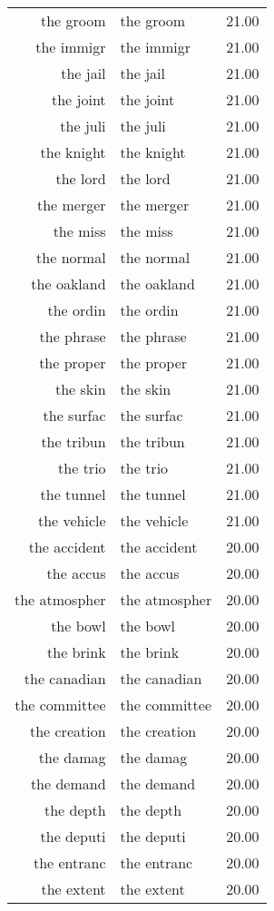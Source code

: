 \begin{table}[ht]
\begin{tabular}{rlr}
  the groom & the groom & 21.00 \\ 
  the immigr & the immigr & 21.00 \\ 
  the jail & the jail & 21.00 \\ 
  the joint & the joint & 21.00 \\ 
  the juli & the juli & 21.00 \\ 
  the knight & the knight & 21.00 \\ 
  the lord & the lord & 21.00 \\ 
  the merger & the merger & 21.00 \\ 
  the miss & the miss & 21.00 \\ 
  the normal & the normal & 21.00 \\ 
  the oakland & the oakland & 21.00 \\ 
  the ordin & the ordin & 21.00 \\ 
  the phrase & the phrase & 21.00 \\ 
  the proper & the proper & 21.00 \\ 
  the skin & the skin & 21.00 \\ 
  the surfac & the surfac & 21.00 \\ 
  the tribun & the tribun & 21.00 \\ 
  the trio & the trio & 21.00 \\ 
  the tunnel & the tunnel & 21.00 \\ 
  the vehicle & the vehicle & 21.00 \\ 
  the accident & the accident & 20.00 \\ 
  the accus & the accus & 20.00 \\ 
  the atmospher & the atmospher & 20.00 \\ 
  the bowl & the bowl & 20.00 \\ 
  the brink & the brink & 20.00 \\ 
  the canadian & the canadian & 20.00 \\ 
  the committee & the committee & 20.00 \\ 
  the creation & the creation & 20.00 \\ 
  the damag & the damag & 20.00 \\ 
  the demand & the demand & 20.00 \\ 
  the depth & the depth & 20.00 \\ 
  the deputi & the deputi & 20.00 \\ 
  the entranc & the entranc & 20.00 \\ 
  the extent & the extent & 20.00 \\ 

\end{tabular}
\end{table}

